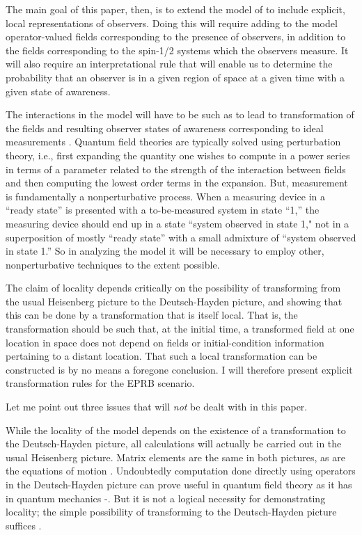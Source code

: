 \documentclass[12pt]{article}
\begin{document}
The main goal of this paper, then, is to extend the model of \cite{Rubin02} to include explicit, local 
representations of observers. Doing this will require adding to the model operator-valued fields corresponding
to the presence of observers, in addition to the fields corresponding to the spin-1/2 systems which the observers
measure. It will also require an interpretational rule that will enable us to determine the probability that an
observer is in a given region of space at a given time with a given state of awareness. 

The interactions in the model will have to be such as to lead to transformation of the fields and resulting observer states of awareness corresponding
to ideal measurements \cite{dEspagnat76}. Quantum field theories are typically solved using perturbation
theory, i.e., first expanding the quantity one wishes to compute in a power series in terms of a  parameter related to
the strength of the interaction between fields and then computing the lowest order terms in the expansion.
But, measurement is fundamentally a nonperturbative process.  When a measuring device in a ``ready state''
is presented with a to-be-measured system in state ``1,'' the measuring device should end up in a state
``system observed in state 1," not in a superposition of mostly ``ready state'' with a small admixture of
``system observed in state 1.'' So in analyzing the model it will be necessary to employ other, nonperturbative
techniques to the extent possible.

The claim of locality depends critically on the possibility of transforming from the usual Heisenberg
picture to the Deutsch-Hayden picture, and showing that this can be done by a transformation that is itself local.  That is, the transformation should be such that, at the initial time, a transformed field at one location in space does not depend on fields or initial-condition information pertaining to a distant location. That such a local transformation can be constructed is by no means a foregone conclusion. I will therefore present explicit transformation rules for  the EPRB scenario.

Let me point out three
issues that will {\em not} be dealt with in this paper.  

While the locality of the model
depends on the existence of a transformation to the Deutsch-Hayden picture, all calculations
will actually be carried out in the usual Heisenberg picture.
Matrix elements are the same in both pictures, as are the equations of motion \cite{Rubin02}.
Undoubtedly computation
done directly using operators in the Deutsch-Hayden picture can prove  useful in quantum field
theory as it has in quantum mechanics \cite{DeutschHayden00}-\cite{HewittHorsmanVedral07Ent}. 
But it is not a logical necessity for demonstrating locality; the simple possibility of transforming to the 
Deutsch-Hayden picture suffices \cite{Rubin02}.
\end{document}

